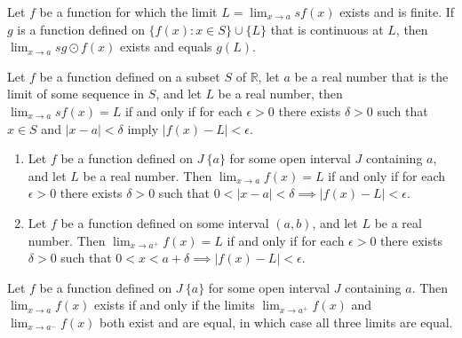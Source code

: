 \begin{theo}{1}
	Let $f$ be a function for which the limit $L = \lim_{x\rightarrow a} s f(x)$ exists and
	is finite. If $g$ is a function defined on $\{f(x) : x \in S\} \cup \{L\}$ that is
	continuous at $L$, then $\lim_{x\rightarrow a} s g \odot f(x)$ exists and equals $g(L)$.
\end{theo}

\begin{theo}{1}
	Let $f$ be a function defined on a subset $S$ of $\mathbb{R}$, let $a$ be a real number that is the limit of some sequence in $S$, and let $L$ be a real number, then $\lim_{x\rightarrow a} s f(x) = L$ if and only if	for each $\epsilon > 0$ there exists $\delta > 0$ such that $x \in S$ and $|x - a| < \delta$ imply $|f(x) - L| < \epsilon$.
	\begin{enumerate}
		\item Let $f$ be a function defined on $J \ \{a\}$ for some open interval $J$ containing $a$, and let $L$ be a real number. Then $\lim_{x\rightarrow a} f(x) = L$ if and only if for each $\epsilon > 0$ there exists $\delta > 0$ such that $0 < |x - a| < \delta \implies |f(x) - L| < \epsilon$.
		\item Let $f$ be a function defined on some interval $(a, b)$, and let $L$ be a	real number. Then $\lim_{x\rightarrow a^+}  f(x) = L$ if and only if	for each $\epsilon > 0$ there exists $\delta > 0$ such that $0 < x < a + \delta \implies |f(x) - L| < \epsilon$.
	\end{enumerate}
\end{theo}

\begin{theo}[]{1}
	Let $f$ be a function defined on $J \ \{a\}$ for some open interval $J$ containing $a$. Then $\lim_{x\rightarrow a} f(x)$ exists if and only if the limits $\lim_{x\rightarrow a^+} f(x)$ and $\lim_{x\rightarrow a^-} f(x)$ both exist and are equal, in which case all three limits are equal.
\end{theo}

